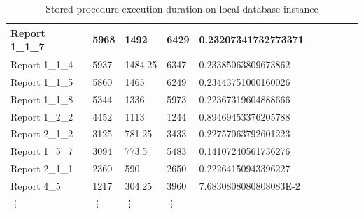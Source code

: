 \documentclass{cslthse-msc}
\begin{document}
\begin{table}[H]
{\begin{tabular}{  l | l | l | l  H  H  H  H  H  }
	Report 1\_1\_7 & 5968 & 1492 & 6429 & 0.23207341732773371 &  &  &  & \  \\ \hline
	Report 1\_1\_4 & 5937 & 1484.25 & 6347 & 0.23385063809673862 &  &  &  & \  \\ \hline
	Report 1\_1\_5 & 5860 & 1465 & 6249 & 0.23443751000160026 &  &  &  & \  \\ \hline
	Report 1\_1\_8 & 5344 & 1336 & 5973 & 0.22367319604888666 &  &  &  & \  \\ \hline
	Report 1\_2\_2 & 4452 & 1113 & 1244 & 0.89469453376205788 &  &  &  & \  \\ \hline
	Report 2\_1\_2 & 3125 & 781.25 & 3433 & 0.22757063792601223 &  &  &  & \  \\ \hline
	Report 1\_5\_7 & 3094 & 773.5 & 5483 & 0.14107240561736276 &  &  &  & \  \\ \hline
	Report 2\_1\_1 & 2360 & 590 & 2650 & 0.22264150943396227 &  &  &  & \  \\ \hline
	Report 4\_5 & 1217 & 304.25 & 3960 & 7.6830808080808083E-2 &  &  &  & \  \\ \hline
	
	\vdots & \vdots & \vdots & \vdots &  &  &  & \  
\end{tabular}}
\caption{Stored procedure execution duration on local database instance}
\label{tab:duration}
\end{table}
\end{document}
